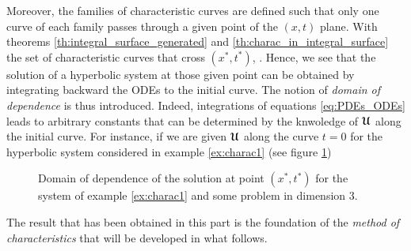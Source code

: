 Moreover, the families of characteristic curves are defined such that only one curve of each family passes through a given point of the $(x,t)$ plane. With theorems \ref{th:integral_surface_generated} and \ref{th:charac_in_integral_surface} the set of characteristic curves that cross $(x^*,t^*)$, . Hence, we see that the solution of a hyperbolic system at those given point can be obtained by integrating backward the ODEs to the initial curve. The notion of \textit{domain of dependence} is thus introduced. Indeed, integrations of equations \eqref{eq:PDEs_ODEs} leads to arbitrary constants that can be determined by the knwoledge of ${\boldsymbol{\mathcal{U}}}$ along the initial curve. For instance, if we are given ${\boldsymbol{\mathcal{U}}}$ along the curve $t=0$ for the hyperbolic system considered in example \ref{ex:charac1} (see figure \ref{fig:charac_method2x2})
\begin{figure}[h]
  \centering
   \qquad
  \caption{Domain of dependence of the solution at point $(x^*,t^*)$ for the system of example \ref{ex:charac1} and some problem in dimension $3$.}
  \label{fig:charac_method2x2}
\end{figure}


%   

The result that has been obtained in this part is the foundation of the \textit{method of characteristics} that will be developed in what follows. 


